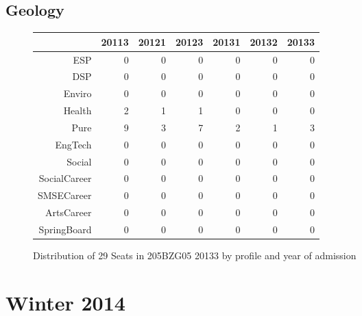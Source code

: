 \documentclass{article}\usepackage[]{graphicx}\usepackage[]{color}
\begin{document}
\subsection{Geology}
\begin{figure}[H]
\centering
\begin{tabular}{rrrrrrr}
  \hline
 & 20113 & 20121 & 20123 & 20131 & 20132 & 20133 \\ 
  \hline
ESP &   0 &   0 &   0 &   0 &   0 &   0 \\ 
  DSP &   0 &   0 &   0 &   0 &   0 &   0 \\ 
  Enviro &   0 &   0 &   0 &   0 &   0 &   0 \\ 
  Health &   2 &   1 &   1 &   0 &   0 &   0 \\ 
  Pure &   9 &   3 &   7 &   2 &   1 &   3 \\ 
  EngTech &   0 &   0 &   0 &   0 &   0 &   0 \\ 
  Social &   0 &   0 &   0 &   0 &   0 &   0 \\ 
  SocialCareer &   0 &   0 &   0 &   0 &   0 &   0 \\ 
  SMSECareer &   0 &   0 &   0 &   0 &   0 &   0 \\ 
  ArtsCareer &   0 &   0 &   0 &   0 &   0 &   0 \\ 
  SpringBoard &   0 &   0 &   0 &   0 &   0 &   0 \\ 
   \hline
\end{tabular}
\caption{Distribution of 29 Seats in 205BZG05 20133 by profile and year of admission} 
\end{figure}



\section{Winter 2014}
\end{document}

